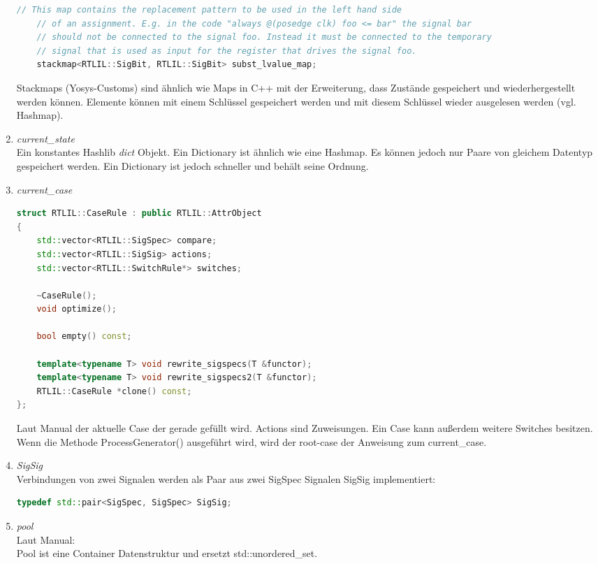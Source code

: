 \documentclass[11pt]{report}
\begin{document}
\begin{enumerate}
\begin{lstlisting}[language=C++]
	// This map contains the replacement pattern to be used in the left hand side
	// of an assignment. E.g. in the code "always @(posedge clk) foo <= bar" the signal bar
	// should not be connected to the signal foo. Instead it must be connected to the temporary
	// signal that is used as input for the register that drives the signal foo.
	stackmap<RTLIL::SigBit, RTLIL::SigBit> subst_lvalue_map;
\end{lstlisting}

Stackmaps (Yosys-Customs) sind ähnlich wie Maps in C++ mit der Erweiterung, dass Zustände gespeichert und wiederhergestellt werden können. Elemente können mit einem Schlüssel gespeichert werden und mit diesem Schlüssel wieder ausgelesen werden (vgl. Hashmap).

\item \textit{current\_state} \\
Ein konstantes Hashlib \textit{dict} Objekt. Ein Dictionary ist ähnlich wie eine  Hashmap. Es können jedoch nur Paare von gleichem Datentyp gespeichert werden. Ein Dictionary ist jedoch schneller und behält seine Ordnung.
\item \textit{current\_case}\\
\begin{lstlisting}[language=C++]
struct RTLIL::CaseRule : public RTLIL::AttrObject
{
	std::vector<RTLIL::SigSpec> compare;
	std::vector<RTLIL::SigSig> actions;
	std::vector<RTLIL::SwitchRule*> switches;

	~CaseRule();
	void optimize();

	bool empty() const;

	template<typename T> void rewrite_sigspecs(T &functor);
	template<typename T> void rewrite_sigspecs2(T &functor);
	RTLIL::CaseRule *clone() const;
};
\end{lstlisting}
Laut Manual der aktuelle Case der gerade gefüllt wird. Actions sind Zuweisungen. Ein Case kann außerdem weitere Switches besitzen.
Wenn die Methode ProcessGenerator() ausgeführt wird, wird der root-case der Anweisung zum current\_case.


\item \textit{SigSig}\\
Verbindungen von zwei Signalen werden als Paar aus zwei SigSpec Signalen SigSig implementiert:
\begin{lstlisting}[language=C++]
	typedef std::pair<SigSpec, SigSpec> SigSig;
\end{lstlisting}

\item \textit{pool}\\
Laut Manual:\\
Pool ist eine Container Datenstruktur und ersetzt std::unordered\_set.

\end{enumerate}
\end{document}
